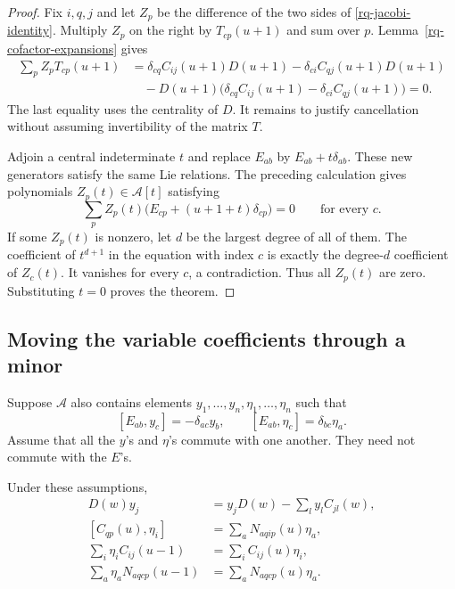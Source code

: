 \begin{proof}
Fix $i,q,j$ and let $Z_p$ be the difference of the
two sides of \eqref{rq-jacobi-identity}.  Multiply
$Z_p$ on the right by $T_{cp}(u+1)$ and sum over $p$.
Lemma~\ref{rq-cofactor-expansions} gives
\begin{align*}
 \sum_p Z_pT_{cp}(u+1)
 &=\delta_{cq}C_{ij}(u+1)D(u+1)
       -\delta_{ci}C_{qj}(u+1)D(u+1)\\
 &\quad-D(u+1)
       \bigl(\delta_{cq}C_{ij}(u+1)
                       -\delta_{ci}C_{qj}(u+1)\bigr)=0.
\end{align*}
The last equality uses the centrality of $D$.
It remains to justify cancellation without assuming
invertibility of the matrix $T$.

Adjoin a central indeterminate $t$ and replace
$E_{ab}$ by $E_{ab}+t\delta_{ab}$.
These new generators satisfy the same Lie relations.
The preceding calculation gives polynomials
$Z_p(t)\in\mathcal A[t]$ satisfying
\[
 \sum_p Z_p(t)\bigl(E_{cp}+(u+1+t)\delta_{cp}\bigr)=0
                       \qquad\text{for every }c.
\]
If some $Z_p(t)$ is nonzero, let $d$ be the largest
degree of all of them.  The coefficient of $t^{d+1}$
in the equation with index $c$ is exactly the
degree-$d$ coefficient of $Z_c(t)$.  It vanishes
for every $c$, a contradiction.  Thus all $Z_p(t)$
are zero.  Substituting $t=0$ proves the theorem.
\end{proof}

\subsection{Moving the variable coefficients through a minor}

Suppose $\mathcal A$ also contains elements
$y_1,\ldots,y_n,\eta_1,\ldots,\eta_n$ such that
\begin{equation}\label{rq-vector-laws}
 [E_{ab},y_c]=-\delta_{ac}y_b,\qquad
 [E_{ab},\eta_c]=\delta_{bc}\eta_a.
\end{equation}
Assume that all the $y$'s and $\eta$'s commute with
one another.  They need not commute with the $E$'s.

\begin{lemma}\label{rq-moving}
Under these assumptions,
\begin{align}
 D(w)y_j
       &=y_jD(w)-\sum_l y_lC_{jl}(w),          \label{rq-det-vector}\\
 [C_{qp}(u),\eta_i]
       &=\sum_a N_{aqip}(u)\eta_a,             \label{rq-minor-covector}\\
 \sum_i\eta_iC_{ij}(u-1)
       &=\sum_iC_{ij}(u)\eta_i,               \label{rq-shift-one}\\
 \sum_a\eta_aN_{aqcp}(u-1)
       &=\sum_aN_{aqcp}(u)\eta_a.             \label{rq-shift-two}
\end{align}
\end{lemma}

